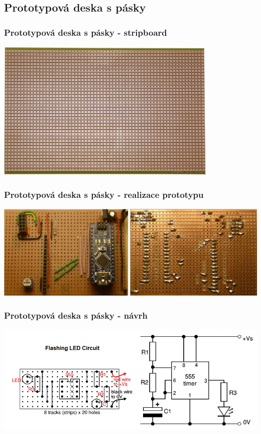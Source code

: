 \documentclass{beamer}
\begin{document}
\subsection{\texorpdfstring{Prototypová deska s pásky}{Prototypova deska s pasky}}
  \begin{frame}
    \frametitle{Prototypová deska s pásky - stripboard}
    \begin{center}
      \includegraphics[width=0.8\textwidth]{obr/stripBoard_bot.png}
    \end{center}
  \end{frame}
  \begin{frame}
    \frametitle{Prototypová deska s pásky - realizace prototypu}
    \begin{center}
      \includegraphics[width=\textwidth]{obr/stripBoard_prot.png}
    \end{center}
  \end{frame}
  \begin{frame}
    \frametitle{Prototypová deska s pásky - návrh}
    \begin{center}
      \includegraphics[width=\textwidth]{obr/stripBoard_desgn.png}
    \end{center}
  \end{frame}
	
\end{document}
